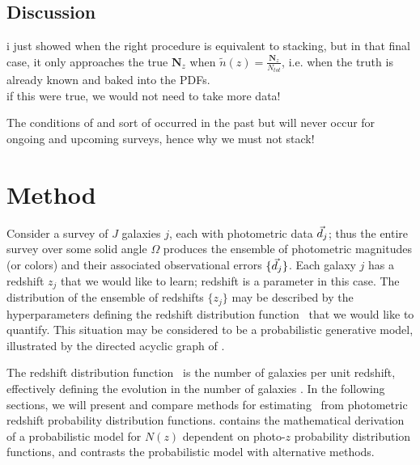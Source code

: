 
\subsection{Discussion}

i just showed when the right procedure is equivalent to stacking, but in that final case, it only approaches the true $\textbf{N}_{z}$ when $\tilde{n}(z) = \frac{\textbf{N}_{z}}{N_{tot}}$, i.e. when the truth is already known and baked into the PDFs.\\
if this were true, we would not need to take more data!

The conditions of  and  sort of occurred in the past but will never occur for ongoing and upcoming surveys, hence why we must not stack!

\section{Method}


Consider a survey of $J$ galaxies $j$, each with photometric data $\vec{d}_{j}$; thus the entire survey over some solid angle $\Omega$ produces the ensemble of photometric magnitudes (or colors) and their associated observational errors $\{\vec{d}_{j}\}$.  
Each galaxy $j$ has a redshift $z_{j}$ that we would like to learn; redshift is a parameter in this case.  
The distribution of the ensemble of redshifts $\{z_{j}\}$ may be described by the hyperparameters defining the redshift distribution function \Nz\ that we would like to quantify.  
This situation may be considered to be a probabilistic generative model, illustrated by the directed acyclic graph of .  

The redshift distribution function \Nz\ is the number of galaxies per unit redshift, effectively defining the evolution in the number of galaxies \citep{Menard2013}.  
In the following sections, we will present and compare methods for estimating \Nz\ from photometric redshift probability distribution functions.  
 contains the mathematical derivation of a probabilistic model for $N(z)$ dependent on photo-$z$ probability distribution functions, and  contrasts the probabilistic model with alternative methods.

